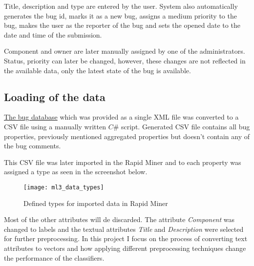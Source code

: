 Title, description and type are entered by the user. System also automatically generates the bug id, marks it as a new bug, assigns a medium priority to the bug, makes the user as the reporter of the bug and sets the opened date to the date and time of the submission.

Component and owner are later manually assigned by one of the administrators. Status, priority can later be changed, however, these changes are not reflected in the available data, only the latest state of the bug is available.

\subsection*{Loading of the data} %

\href{http://2012.msrconf.org/challenge_data/android_platform_bugs.rar}{The bug database}
which was provided as a single XML file was converted to a CSV file using a manually written $C\#$ script. Generated CSV file contains all bug properties, previously mentioned aggregated properties but doesn't contain any of the bug comments.

This CSV file was later imported in the Rapid Miner and to each property was assigned a type as seen in the screenshot below.

\begin{figure}
\begin{center}
\texttt{[image: ml3\_data\_types]}
\caption{Defined types for imported data in Rapid Miner}
\end{center}
\end{figure}

Most of the other attributes will de discarded. The attribute {\it Component} was changed to labels and the textual attributes {\it Title} and {\it Description} were selected for further preprocessing. 
In this project I focus on the process of converting text attributes to vectors and how applying different preprocessing techniques change the performance of the classifiers.

